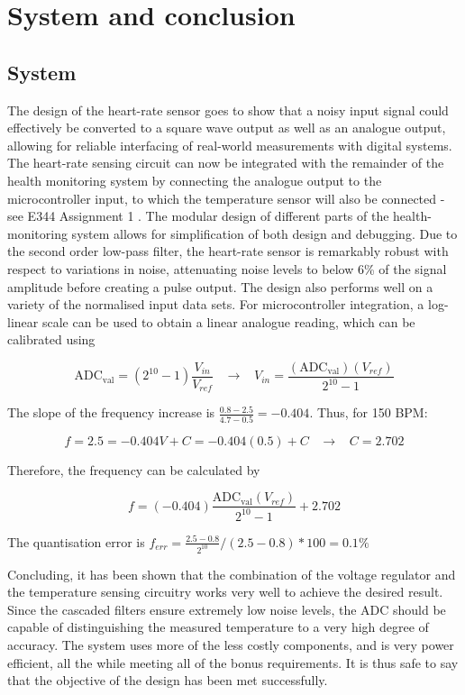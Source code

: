 \chapter{System and conclusion}
\vspace{-5mm}
\section{System}

The design of the heart-rate sensor goes to show that a noisy input signal could effectively be converted to a square wave output as well as an analogue output, allowing for reliable interfacing of real-world measurements with digital systems. The heart-rate sensing circuit can now be integrated with the remainder of the health monitoring system by connecting the analogue output to the microcontroller input, to which the temperature sensor will also be connected - see E344 Assignment 1 \cite{prev}. The modular design of different parts of the health-monitoring system allows for simplification of both design and debugging. Due to the second order low-pass filter, the heart-rate sensor is remarkably robust with respect to variations in noise, attenuating noise levels to below 6\% of the signal amplitude before creating a pulse output. The design also performs well on a variety of the normalised input data sets. For microcontroller integration, a log-linear scale can be used to obtain a linear analogue reading, which can be calibrated using

$$\mathrm{ADC_{val}} = (2^{10}-1)\frac{V_{in}}{V_{ref}} \;\;\; \rightarrow \;\;\; V_{in} = \frac{(\mathrm{ADC_{val}})(V_{ref})}{2^{10}-1}$$

The slope of the frequency increase is $\frac{0.8-2.5}{4.7-0.5} = -0.404$. Thus, for 150 BPM:

$$f = 2.5 = -0.404V + C = -0.404(0.5) + C \;\;\; \rightarrow \;\;\; C = 2.702$$

Therefore, the frequency can be calculated by

$$f = (-0.404)\frac{\mathrm{ADC_{val}}(V_{ref})}{2^{10}-1} + 2.702$$

The quantisation error is $f_{err} = \frac{2.5 - 0.8}{2^{10}} / (2.5 - 0.8) * 100 = 0.1\%$

Concluding, it has been shown that the combination of the voltage regulator and the temperature sensing circuitry works very well to achieve the desired result. Since the cascaded filters ensure extremely low noise levels, the ADC should be capable of distinguishing the measured temperature to a very high degree of accuracy. The system uses more of the less costly components, and is very power efficient, all the while meeting all of the bonus requirements. It is thus safe to say that the objective of the design has been met successfully.


